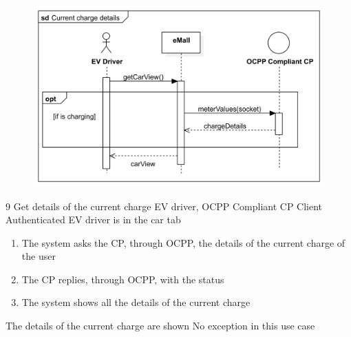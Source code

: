 \pagebreak
\usecase
{
    \begin{figure}[H]
        \centering
        \includegraphics[scale=0.9]{src/sequence_diagram/currentChargeDetails.png}
    \end{figure}
}
{9}
{Get details of the current charge}
{EV driver, OCPP Compliant CP Client}
{Authenticated EV driver is in the car tab}
{
    \begin{enumerate}
        \item The system asks the CP, through OCPP, the details of the current charge of the user
        \item The CP replies, through OCPP, with the status
        \item The system shows all the details of the current charge
    \end{enumerate}
}
{The details of the current charge are shown}
{
    No exception in this use case
}
{
}

